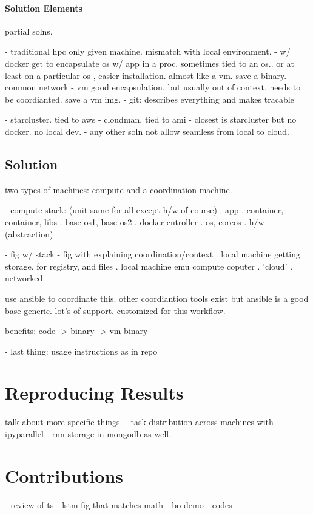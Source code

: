 \subsubsection{Solution Elements}

partial solns.

- traditional hpc only given machine. mismatch with local environment.
- w/ docker get to encapsulate os w/ app in a proc. sometimes tied to an os.. or at least on a particular os , easier installation. almost like a vm. save a binary.
- common network
- vm good encapsulation. but usually out of context. needs to be coordianted. save a vm img.
- git: describes everything and makes tracable


- starcluster. tied to aws
- cloudman. tied to ami
- closest is starcluster but no docker. no local dev.
- any other soln not allow seamless from local to cloud.


\section{Solution}

two types of machines: compute and a coordination machine.

- compute stack: (unit same for all except h/w of course)
. app
. container, container, libs
. base os1, base os2
. docker cntroller
. os, coreos
. h/w (abstraction)



- fig w/ stack
- fig with explaining coordination/context
. local machine getting storage. for registry, and files
. local machine emu compute coputer
. 'cloud'
. networked 

use ansible to coordinate this. other coordiantion tools exist but ansible is a good base generic. lot's of support. customized for this workflow.


benefits:
code -> binary -> vm binary

- last thing: usage instructions as in repo


\chapter{Reproducing Results}

talk about more specific things.
- task distribution across machines with ipyparallel
- rnn storage in mongodb as well.

\chapter{Contributions}

- review of ts
- lstm fig that matches math
- bo demo
- codes

